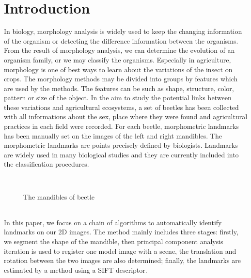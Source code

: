 \documentclass[twoside,twocolumn,10pt]{article}
\begin{document}


\section{Introduction}

\copyrightspace
In biology, morphology analysis is widely used to keep the changing
information of the organism or detecting the difference information
between the organisms. From the result of morphology analysis, we can
determine the evolution of an organism family, or we may classify the
organisms. Especially in agriculture, morphology is one of best ways
to learn about the variations of the insect on crops. The morphology
methods may be divided into groups by features which are used
by the methods. The features can be such as shape, structure, color, pattern or size of the
object. In the aim to study the potential links between these
variations and agricultural ecosystems, a set of beetles has been
collected with all informations about the sex, place where they were
found and agricultural practices in each field were recorded. For each
beetle, morphometric landmarks has been manually set on the images of
the left and right mandibles. The morphometric landmarks are points precisely defined by biologists. Landmarks are
widely used in many biological studies and they are currently included
into the classification procedures.\\[0.1cm]


\begin{figure}[h]
\centering
{}~~
\caption{The mandibles of beetle}
\label{figparts}
\end{figure}~\\[0.1cm]
In this paper, we focus on a chain of algorithms to automatically identify  landmarks on our 2D images. The method
mainly includes three stages: firstly, we segment the shape of the
mandible, then principal component analysis iteration is 
used to register one model image with a scene, the translation and
rotation between the two images are also determined; finally, the
landmarks are estimated by a method using a SIFT descriptor.\\
\end{document}

